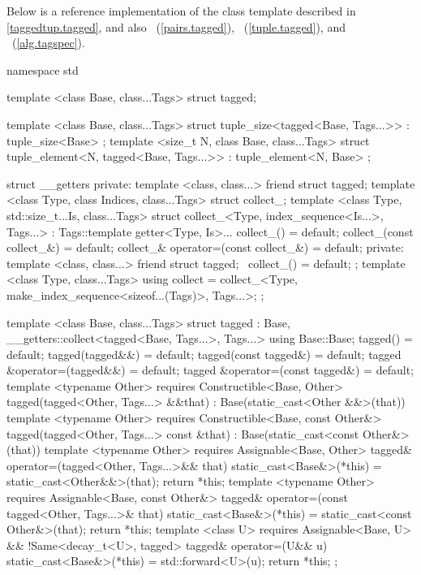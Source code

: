 
\pnum Below is a reference implementation of the  class template described in
\ref{taggedtup.tagged}, and also ~(\ref{pairs.tagged}),
~(\ref{tuple.tagged}), and ~(\ref{alg.tagspec}).

\begin{codeblock}
namespace std {
  template <class Base, class...Tags>
  struct tagged;

  template <class Base, class...Tags>
  struct tuple_size<tagged<Base, Tags...>>
    : tuple_size<Base> { };
  template <size_t N, class Base, class...Tags>
  struct tuple_element<N, tagged<Base, Tags...>>
    : tuple_element<N, Base> { };

  struct __getters {
  private:
    template <class, class...> friend struct tagged;
    template <class Type, class Indices, class...Tags>
    struct collect_;
    template <class Type, std::size_t...Is, class...Tags>
    struct collect_<Type, index_sequence<Is...>, Tags...>
      : Tags::template getter<Type, Is>... {
      collect_() = default;
      collect_(const collect_&) = default;
      collect_& operator=(const collect_&) = default;
    private:
      template <class, class...> friend struct tagged;
      ~collect_() = default;
    };
    template <class Type, class...Tags>
    using collect = collect_<Type, make_index_sequence<sizeof...(Tags)>, Tags...>;
  };

  template <class Base, class...Tags>
  struct tagged
    : Base, __getters::collect<tagged<Base, Tags...>, Tags...> {
    using Base::Base;
    tagged() = default;
    tagged(tagged&&) = default;
    tagged(const tagged&) = default;
    tagged &operator=(tagged&&) = default;
    tagged &operator=(const tagged&) = default;
    template <typename Other>
      requires Constructible<Base, Other>
    tagged(tagged<Other, Tags...> &&that)
      : Base(static_cast<Other &&>(that)) { }
    template <typename Other>
      requires Constructible<Base, const Other&>
    tagged(tagged<Other, Tags...> const &that)
      : Base(static_cast<const Other&>(that)) { }
    template <typename Other>
      requires Assignable<Base, Other>
    tagged& operator=(tagged<Other, Tags...>&& that) {
      static_cast<Base&>(*this) = static_cast<Other&&>(that);
      return *this;
    }
    template <typename Other>
      requires Assignable<Base, const Other&>
    tagged& operator=(const tagged<Other, Tags...>& that) {
      static_cast<Base&>(*this) = static_cast<const Other&>(that);
      return *this;
    }
    template <class U>
      requires Assignable<Base, U> && !Same<decay_t<U>, tagged>
    tagged& operator=(U&& u) {
      static_cast<Base&>(*this) = std::forward<U>(u);
      return *this;
    }
  };

}
\end{codeblock}
